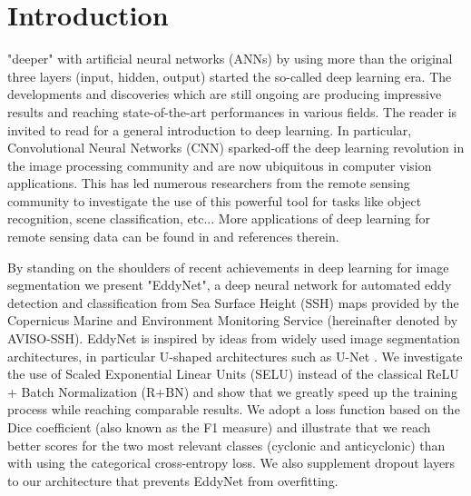 \documentclass[journal]{IEEEtran}
\begin{document}
%
\IEEEpeerreviewmaketitle



\section{Introduction}
% 
% 
% 
% 
 "deeper" with artificial neural networks (ANNs) by using more than the original three layers (input, hidden, output) started the so-called deep learning era. The developments and discoveries which are still ongoing are producing impressive results and reaching state-of-the-art performances in various fields. The reader is invited to read \cite{goodfellow2016deep} for a general introduction to deep learning. In particular, Convolutional Neural Networks (CNN) sparked-off the deep learning revolution in the image processing community and are now ubiquitous in computer vision applications. This has led numerous researchers from the remote sensing community to investigate the use of this powerful tool for tasks like object recognition, scene classification, etc... More applications of deep learning for remote sensing data can be found in \cite{zhang2016deep,DLforRS} and references therein.

By standing on the shoulders of recent achievements in deep learning for image segmentation we present "EddyNet", a deep neural network for automated eddy detection and classification from Sea Surface Height (SSH) maps provided by the Copernicus Marine and Environment Monitoring Service (hereinafter denoted by AVISO-SSH). EddyNet is inspired by ideas from widely used image segmentation architectures, in particular U-shaped architectures such as U-Net \cite{ronneberger2015u}. We investigate the use of Scaled Exponential Linear Units (SELU) \cite{klambauer2017self,clevert2015fast} instead of the classical ReLU + Batch Normalization (R+BN) and show that we greatly speed up the training process while reaching comparable results. We adopt a loss function based on the Dice coefficient (also known as the F1 measure) and illustrate that we reach better scores for the two most relevant classes (cyclonic and anticyclonic) than with using the categorical cross-entropy loss. We also supplement dropout layers to our architecture that prevents EddyNet from overfitting.
\end{document}
